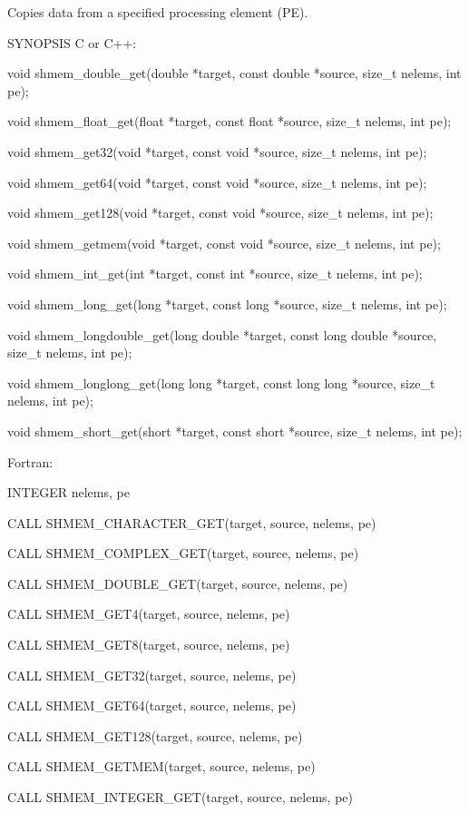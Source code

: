        Copies data from a specified processing element (PE).

SYNOPSIS
       C or C++:

	  void shmem_double_get(double *target, const double  *source,	size_t
	  nelems, int pe);

	  void shmem_float_get(float *target, const float *source, size_t nelems,
	  int pe);

	  void shmem_get32(void *target, const void *source, size_t  nelems,  int
	  pe);

	  void	shmem_get64(void  *target, const void *source, size_t nelems, int
	  pe);

	  void shmem_get128(void *target, const void *source, size_t nelems,  int
	  pe);

	  void	shmem_getmem(void *target, const void *source, size_t nelems, int
	  pe);

	  void shmem_int_get(int *target, const int *source, size_t  nelems,  int
	  pe);

	  void	shmem_long_get(long  *target,  const long *source, size_t nelems,
	  int pe);

	  void shmem_longdouble_get(long double	 *target,  const  long	double
	  *source, size_t nelems, int pe);

	  void	shmem_longlong_get(long long *target, const long long *source,
	  size_t nelems, int pe);

	  void shmem_short_get(short *target, const short *source, size_t nelems,
	  int pe);

       Fortran:

	  INTEGER nelems, pe

	  CALL SHMEM_CHARACTER_GET(target, source, nelems, pe)

	  CALL SHMEM_COMPLEX_GET(target, source, nelems, pe)

	  CALL SHMEM_DOUBLE_GET(target, source, nelems, pe)

	  CALL SHMEM_GET4(target, source, nelems, pe)

	  CALL SHMEM_GET8(target, source, nelems, pe)

	  CALL SHMEM_GET32(target, source, nelems, pe)

	  CALL SHMEM_GET64(target, source, nelems, pe)

	  CALL SHMEM_GET128(target, source, nelems, pe)

	  CALL SHMEM_GETMEM(target, source, nelems, pe)

	  CALL SHMEM_INTEGER_GET(target, source, nelems, pe)

